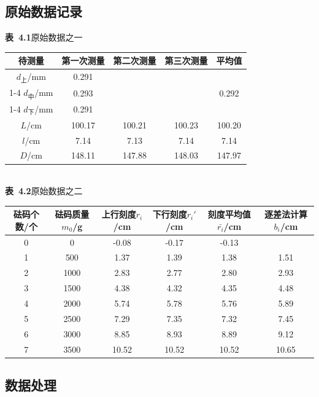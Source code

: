\documentclass{article}
\begin{document}
\subsection{原始数据记录}
    \begin{center}
        \textbf{表\ 4.1}\quad 原始数据之一  \\[4pt]
        \begin{tabular}{|c|c|c|c|c|}
        \hline
            待测量 & 第一次测量 & 第二次测量 & 第三次测量 & 平均值 \\ \hline
            $d_\text{上}$/mm & 0.291 &  &  &  ~\\ \cline{1-4}
            $d_\text{中}$/mm & 0.293 &  &  &  0.292\\ \cline{1-4}
            $d_\text{下}$/mm & 0.291 &  &  &  ~\\  \hline
            $L$/cm & 100.17 & 100.21 & 100.23 & 100.20 \\ \hline
            $l$/cm & 7.14 & 7.13 & 7.14 & 7.14 \\ \hline
            $D$/cm & 148.11 & 147.88 & 148.03 & 147.97 \\ \hline 
        \end{tabular}\\[12pt]
        \textbf{表\ 4.2}\quad 原始数据之二  \\[4pt]
        \begin{tabular}{|c|c|c|c|c|c|}
        \hline
            砝码个数/个 & 砝码质量$m_0$/g & 上行刻度$r_i$/cm &下行刻度$r_i'$/cm & 刻度平均值$\bar{r_i}$/cm & 逐差法计算$b_i$/cm \\ \hline
            0	& 0 &	    -0.08 &	-0.17 &	-0.13   & ~ \\ \hline
            1	& 500 &	    1.37 &	1.39 &	1.38    & 1.51 \\ \hline
            2	& 1000 &	2.83 &	2.77 &	2.80    & 2.93 \\ \hline
            3	& 1500 &	4.38 &	4.32 &	4.35    & 4.48 \\ \hline
            4	& 2000 &	5.74 &	5.78 &	5.76    & 5.89 \\ \hline
            5	& 2500 &	7.29 &	7.35 &	7.32 	& 7.45 \\ \hline
            6	& 3000 &	8.85 &	8.93 &	8.89    & 9.12 \\ \hline
            7	& 3500 &	10.52 &	10.52 &	10.52   & 10.65 \\ \hline
        \end{tabular}
    \end{center}
\subsection{数据处理}
\end{document}

